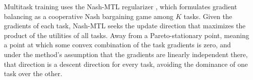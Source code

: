 Multitask training uses the Nash-MTL regularizer \cite{nash}, which formulates gradient balancing as a cooperative Nash bargaining game among $K$ tasks. Given the gradients of each task, Nash-MTL seeks the update direction that maximizes the product of the utilities of all tasks. Away from a Pareto-stationary point, meaning a point at which some convex combination of the task gradients is zero, and under the method's assumption that the gradients are linearly independent there, that direction is a descent direction for every task, avoiding the dominance of one task over the other.
